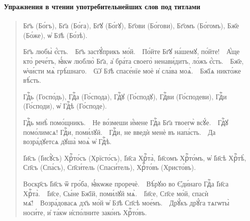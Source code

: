 \documentclass[11pt,a4paper,oneside]{memoir}
\newcommand{\exercise}{}
\begin{document}
    \textbf{Упражнения в чтении употребительнейших слов под титлами}

                    \paragraph{\exercise}
    
    \begin{quote}\begin{slv}
        Бг҃ъ (Бо́гъ), Бг҃а (Бо́га), Бг҃ꙋ (Бо́гꙋ), Бг҃ови (Бо́гови), Бг҃омъ (Бо́гомъ), Бж҃е (Бо́же), ѡ҆ Бз҃ѣ (Бо́зѣ).
        
        Бг҃ъ любы̀ є҆́сть.~\textemdash~Бг҃ъ застꙋ́прикъ мо́й.~\textemdash~По́йте Бг҃ꙋ на́шемꙋ, по́йте!~\textemdash~А҆́ще кто̀ рече́тъ, ꙗ҆́кѡ люблю̀ Бг҃а, а҆ бра́та своего̀ ненави́дитъ, ло́жъ є҆́сть.~\textemdash~Бж҃е, ѡ҆чи́сти мѧ̀ грѣ́шнаго.~\textemdash~Ѡ҆ Бз҃ѣ спасе́нїе моѐ и҆ сла́ва моѧ̀.~\textemdash~Бж҃їѧ никто́же вѣ́сть.
        
        Гдⷭ҇ь (Госпо́дь), Гдⷭ҇а (Го́спода), Гдⷭ҇ꙋ (Го́сподꙋ), Гдⷭ҇ви (Го́сподеви), Гдⷭ҇и (Го́споди), ѡ҆ Гдⷭ҇ѣ (Го́споде).
        
        Гдⷭ҇ь мнѣ̀ помо́щникъ.~\textemdash~Не во́змеши и҆́мене Гдⷭ҇а Бг҃а твоегѡ̀ всꙋ́е.~\textemdash~Гдⷭ҇ꙋ помо́лимсѧ! Гдⷭ҇и, поми́лꙋй.~\textemdash~Гдⷭ҇и, не введѝ менѐ въ напа́сть.~\textemdash~Да возра́дꙋетсѧ дꙋша̀ моѧ̀ ѡ҆ Гдⷭ҇ѣ.
        
        І҆и҃съ (І҆исꙋ̀съ) Хрⷭ҇то́съ (Хрїсто́съ), І҆и҃са Хрⷭ҇та̀, І҆и҃сомъ Хрⷭ҇то́мъ, ѡ҆ І҆и҃сѣ Хрⷭ҇тѣ̀, Сп҃съ (Спа́съ), Сп҃си́тель (Спаси́тель), Хрⷭ҇то́въ (Христо́въ).
        
        Воскр҃съ І҆и҃съ ѿ гро́ба, ꙗ҆́кѡже проречѐ.~\textemdash~Вѣ́рꙋю во Є҆ди́наго Гдⷭ҇а І҆и҃са Хрⷭ҇та̀.~\textemdash~І҆и҃се, Сы́не Бж҃їй, поми́лꙋй мѧ̀.~\textemdash~І҆и҃се, Сп҃се мо́й, спасѝ мѧ҃!~\textemdash~Возра́довасѧ дх҃ъ мо́й ѡ҆ Бз҃ѣ Сп҃сѣ мое́мъ.~\textemdash~Дрꙋ́къ дрꙋ́га тѧгѡты̀ носи́те, и҆ та́кѡ и҆спо́лните зако́нъ Хрⷭ҇то́въ.
    \end{slv}\end{quote}

                    \paragraph{\exercise}
    
\end{document}
